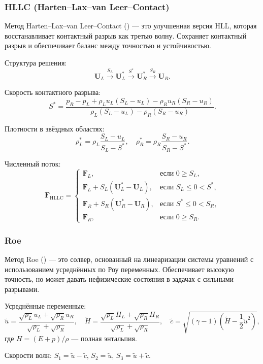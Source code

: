 \documentclass[a4paper,12pt]{extarticle}
\begin{document}
\subsubsection{HLLC (Harten–Lax–van Leer–Contact)}

Метод Harten–Lax–van Leer–Contact (\cite[Глава 10.3]{toro2009}) — это улучшенная версия HLL, которая восстанавливает контактный разрыв как третью волну. Сохраняет контактный разрыв и обеспечивает баланс между точностью и устойчивостью.

Структура решения:
\[
\mathbf{U}_L \xrightarrow{S_L} \mathbf{U}_L^* \xrightarrow{S^*} \mathbf{U}_R^* \xrightarrow{S_R} \mathbf{U}_R.
\]

Скорость контактного разрыва:
\[
S^* = \frac{p_R - p_L + \rho_L u_L (S_L - u_L) - \rho_R u_R (S_R - u_R)}{\rho_L (S_L - u_L) - \rho_R (S_R - u_R)}.
\]

Плотности в звёздных областях:
\[
\rho_L^* = \rho_L \frac{S_L - u_L}{S_L - S^*}, \quad \rho_R^* = \rho_R \frac{S_R - u_R}{S_R - S^*}.
\]

Численный поток:
\[
\mathbf{F}_{\text{HLLC}} = 
\begin{cases}
\mathbf{F}_L, & \text{если } 0 \geq S_L, \\
\mathbf{F}_L + S_L(\mathbf{U}_L^* - \mathbf{U}_L), & \text{если } S_L \leq 0 < S^*, \\
\mathbf{F}_R + S_R(\mathbf{U}_R^* - \mathbf{U}_R), & \text{если } S^* \leq 0 < S_R, \\
\mathbf{F}_R, & \text{если } 0 \geq S_R.
\end{cases}
\]

\subsubsection{Roe}

Метод Roe (\cite[Глава 10.4]{toro2009}) — это солвер, основанный на линеаризации системы уравнений с использованием усреднённых по Роу переменных. Обеспечивает высокую точность, но может давать нефизические состояния в задачах с сильными разрывами.

Усреднённые переменные:
\[
\tilde{u} = \frac{\sqrt{\rho_L} u_L + \sqrt{\rho_R} u_R}{\sqrt{\rho_L} + \sqrt{\rho_R}}, \quad
\tilde{H} = \frac{\sqrt{\rho_L} H_L + \sqrt{\rho_R} H_R}{\sqrt{\rho_L} + \sqrt{\rho_R}}, \quad
\tilde{c} = \sqrt{(\gamma - 1) \left( \tilde{H} - \frac{1}{2} \tilde{u}^2 \right)},
\]
где $H = (E + p)/\rho$ — полная энтальпия.

Скорости волн: $S_1 = \tilde{u} - \tilde{c}$, $S_2 = \tilde{u}$, $S_3 = \tilde{u} + \tilde{c}$.
\end{document}
